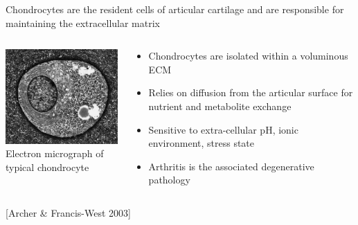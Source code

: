 \documentclass[ignorenonframetext]{beamer}
\newcommand{\references}[1] {
  \begin{flushright}
    \scriptsize [#1] \normalsize
  \end{flushright}
}
\begin{document}
\begin{frame}{Chondrocytes are the resident cells of articular
    cartilage and are responsible for maintaining the extracellular
    matrix}

 \begin{columns}

    \begin{column}{6cm}
      \begin{center}
      \includegraphics[width=6cm]{../images/pdf/chondrocyte-micrograph}
      {\\[-0.1cm] \scriptsize Electron micrograph of typical chondrocyte}
      \end{center}
    \end{column}

    \begin{column}{6cm}
      \begin{itemize}
      \item<1-> Chondrocytes are isolated within a voluminous
        ECM
      \item<1-> Relies on diffusion from the articular surface for
        nutrient and metabolite exchange\\[0.5cm]
        \pause
      \item<2-> Sensitive to extra-cellular pH, ionic environment,
        stress state
      \item<2-> Arthritis is the associated degenerative pathology
      \end{itemize}
    \end{column}

  \end{columns}

  \references{Archer \& Francis-West 2003}

\end{frame}

%
\end{document}
